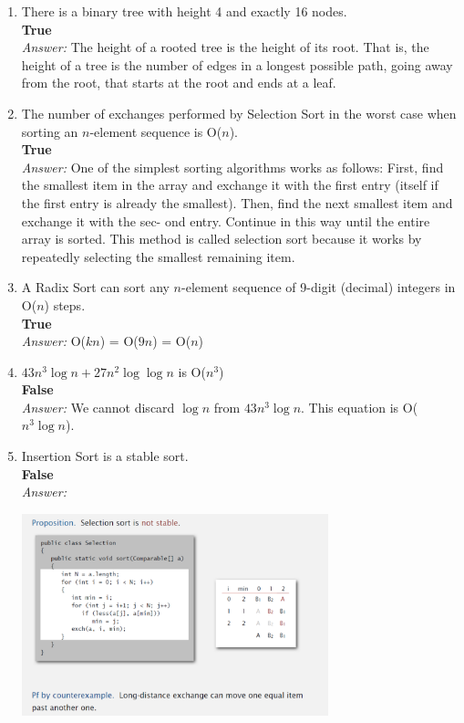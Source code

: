 \documentclass[a4paper]{article}
\newcommand{\ans}{\textit{Answer: }}
\begin{document}
\begin{enumerate}
  \item There is a binary tree with height 4 and exactly 16 nodes. \\ 
  \textbf{True} \\
  \ans The height of a rooted tree is the height of its root. That is, the height of a tree is the number of edges in a longest possible path, going away from the root, that starts at the root and ends at a leaf.

  \item The number of exchanges performed by Selection Sort in the worst case when sorting an $n$-element sequence is O($n$). \\
  \textbf{True} \\
  \ans One of the simplest sorting algorithms works as follows: First, find the smallest item in the array and exchange it with the first entry (itself if the first entry is already the smallest). Then, find the next smallest item and exchange it with the sec- ond entry. Continue in this way until the entire array is sorted. This method is called selection sort because it works by repeatedly selecting the smallest remaining item.

  \item A Radix Sort can sort any $n$-element sequence of 9-digit (decimal) integers in O($n$) steps. \\ 
  \textbf{True} \\
  \ans O($kn$) = O($9n$) = O($n$)

  \item  $43n^3\log n + 27n^2 \log \log n$ is O($n^3$) \\
  \textbf{False} \\
  \ans We cannot discard $\log n$ from $43n^3\log n$. This equation is O($n^3\log n$).

  \item Insertion Sort is a stable sort. \\
  \textbf{False} \\
  \ans
  \begin{center}
    \includegraphics[width=0.7\textwidth]{fig4.png}
  \end{center}

\end{enumerate}
\end{document}

